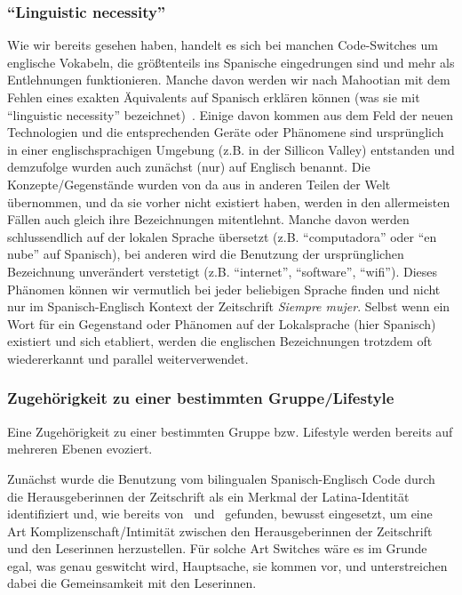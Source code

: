 \subsubsection{``Linguistic necessity''}
Wie wir bereits gesehen haben, handelt es sich bei manchen Code-Switches um englische Vokabeln, die größtenteils ins Spanische eingedrungen sind und mehr als Entlehnungen funktionieren.
Manche davon werden wir nach Mahootian mit dem Fehlen eines exakten Äquivalents auf Spanisch erklären können (was sie mit ``linguistic necessity'' bezeichnet)~\cite{Mahootian05}.
Einige davon kommen aus dem Feld der neuen Technologien und die entsprechenden Geräte oder Phänomene sind ursprünglich in einer englischsprachigen Umgebung (z.B. in der Sillicon Valley) entstanden und demzufolge wurden auch zunächst (nur) auf Englisch benannt.
Die Konzepte/Gegenstände wurden von da aus in anderen Teilen der Welt übernommen, und da sie vorher nicht existiert haben, werden in den allermeisten Fällen auch gleich ihre Bezeichnungen mitentlehnt.
Manche davon werden schlussendlich auf der lokalen Sprache übersetzt (z.B. ``computadora'' oder ``en nube'' auf Spanisch), bei anderen wird die Benutzung der ursprünglichen Bezeichnung unverändert verstetigt (z.B. ``internet'', ``software'', ``wifi'').
Dieses Phänomen können wir vermutlich bei jeder beliebigen Sprache finden und nicht nur im Spanisch-Englisch Kontext der Zeitschrift \textit{Siempre mujer}.
Selbst wenn ein Wort für ein Gegenstand oder Phänomen auf der Lokalsprache (hier Spanisch) existiert und sich etabliert, werden die englischen Bezeichnungen trotzdem oft wiedererkannt und parallel weiterverwendet.

\subsubsection{Zugehörigkeit zu einer bestimmten Gruppe/Lifestyle}
Eine Zugehörigkeit zu einer bestimmten Gruppe bzw. Lifestyle werden bereits auf mehreren Ebenen evoziert.

Zunächst wurde die Benutzung vom bilingualen Spanisch-Englisch Code durch die Herausgeberinnen der Zeitschrift als ein Merkmal der Latina-Identität identifiziert und, wie bereits von~\cite{Ticknor12} und~\cite{Mahootian05} gefunden, bewusst eingesetzt, um eine Art Komplizenschaft/Intimität zwischen den Herausgeberinnen der Zeitschrift und den Leserinnen herzustellen.
Für solche Art Switches wäre es im Grunde egal, was genau geswitcht wird, Hauptsache, sie kommen vor, und unterstreichen dabei die Gemeinsamkeit mit den Leserinnen.

